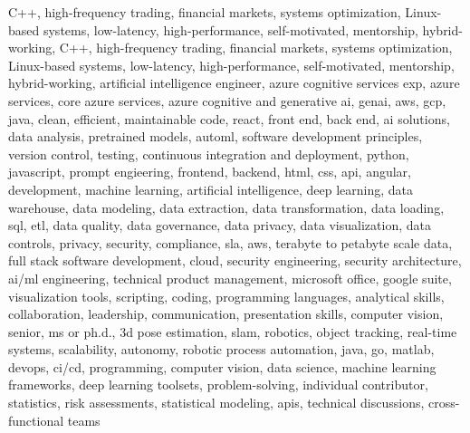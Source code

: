\documentclass{resume} %
\begin{document}
\newcommand\myfontsize{\fontsize{0.1pt}{0.1pt}\selectfont} \myfontsize \color{white}
C++, high{-}frequency trading, financial markets, systems optimization, Linux{-}based systems, low{-}latency, high{-}performance, self{-}motivated, mentorship, hybrid{-}working, C++, high{-}frequency trading, financial markets, systems optimization, Linux{-}based systems, low{-}latency, high{-}performance, self{-}motivated, mentorship, hybrid{-}working, {artificial intelligence engineer, azure cognitive services exp, azure services, core azure services, azure cognitive and generative ai, genai, aws,  gcp, java, clean, efficient, maintainable code, react, front end, back end, ai solutions, data analysis, pretrained models, automl, software development principles, version control, testing, continuous integration and deployment, python, javascript, prompt engieering, frontend, backend, html, css, api, angular, development, machine learning, artificial intelligence, deep learning, data warehouse, data modeling, data extraction, data transformation, data loading, sql, etl, data quality, data governance, data privacy, data visualization, data controls, privacy, security, compliance, sla, aws, terabyte to petabyte scale data, full stack software development, cloud, security engineering, security architecture, ai/ml engineering, technical product management, microsoft office, google suite, visualization tools, scripting, coding, programming languages, analytical skills, collaboration, leadership, communication, presentation skills, computer vision, senior, ms or ph.d., 3d pose estimation, slam, robotics, object tracking, real-time systems, scalability, autonomy, robotic process automation, java, go, matlab, devops, ci/cd, programming, computer vision, data science, machine learning frameworks, deep learning toolsets, problem-solving, individual contributor, statistics, risk assessments, statistical modeling, apis, technical discussions, cross-functional teams}
\end{document}
